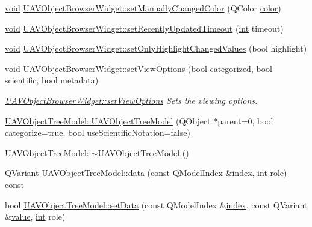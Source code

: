 \begin{DoxyCompactItemize}
\item 
\hyperlink{group___u_a_v_objects_plugin_ga444cf2ff3f0ecbe028adce838d373f5c}{void} \hyperlink{group___u_a_v_object_browser_plugin_gaee39097c4bce5dcff47148b0bf22f9e7}{U\-A\-V\-Object\-Browser\-Widget\-::set\-Manually\-Changed\-Color} (Q\-Color \hyperlink{glext_8h_a3ea846f998d64f079b86052b6c4193a8}{color})
\item 
\hyperlink{group___u_a_v_objects_plugin_ga444cf2ff3f0ecbe028adce838d373f5c}{void} \hyperlink{group___u_a_v_object_browser_plugin_ga7c8fdd1c763ccc45089b7b7158f49630}{U\-A\-V\-Object\-Browser\-Widget\-::set\-Recently\-Updated\-Timeout} (\hyperlink{ioapi_8h_a787fa3cf048117ba7123753c1e74fcd6}{int} timeout)
\item 
\hyperlink{group___u_a_v_objects_plugin_ga444cf2ff3f0ecbe028adce838d373f5c}{void} \hyperlink{group___u_a_v_object_browser_plugin_ga964995701170a95cc21eb78fb25acb9d}{U\-A\-V\-Object\-Browser\-Widget\-::set\-Only\-Highlight\-Changed\-Values} (bool highlight)
\item 
\hyperlink{group___u_a_v_objects_plugin_ga444cf2ff3f0ecbe028adce838d373f5c}{void} \hyperlink{group___u_a_v_object_browser_plugin_ga21f21843b8cf0310d7cac16dbb79846c}{U\-A\-V\-Object\-Browser\-Widget\-::set\-View\-Options} (bool categorized, bool scientific, bool metadata)
\begin{DoxyCompactList}\small\item\em \hyperlink{group___u_a_v_object_browser_plugin_ga21f21843b8cf0310d7cac16dbb79846c}{U\-A\-V\-Object\-Browser\-Widget\-::set\-View\-Options} Sets the viewing options. \end{DoxyCompactList}\item 
\hyperlink{group___u_a_v_object_browser_plugin_ga7c48c4fa7c5b464e0127d929f8610964}{U\-A\-V\-Object\-Tree\-Model\-::\-U\-A\-V\-Object\-Tree\-Model} (Q\-Object $\ast$parent=0, bool categorize=true, bool use\-Scientific\-Notation=false)
\item 
\hyperlink{group___u_a_v_object_browser_plugin_ga162709965b0a670c87305d09bf3d5e76}{U\-A\-V\-Object\-Tree\-Model\-::$\sim$\-U\-A\-V\-Object\-Tree\-Model} ()
\item 
Q\-Variant \hyperlink{group___u_a_v_object_browser_plugin_ga7e2af1d5c89b55437fb74df890b24a53}{U\-A\-V\-Object\-Tree\-Model\-::data} (const Q\-Model\-Index \&\hyperlink{glext_8h_ab47dd9958bcadea08866b42bf358e95e}{index}, \hyperlink{ioapi_8h_a787fa3cf048117ba7123753c1e74fcd6}{int} role) const 
\item 
bool \hyperlink{group___u_a_v_object_browser_plugin_ga3327e2ff6b418ae404a06d7c990fbc50}{U\-A\-V\-Object\-Tree\-Model\-::set\-Data} (const Q\-Model\-Index \&\hyperlink{glext_8h_ab47dd9958bcadea08866b42bf358e95e}{index}, const Q\-Variant \&\hyperlink{glext_8h_aa0e2e9cea7f208d28acda0480144beb0}{value}, \hyperlink{ioapi_8h_a787fa3cf048117ba7123753c1e74fcd6}{int} role)

\end{DoxyCompactItemize}

